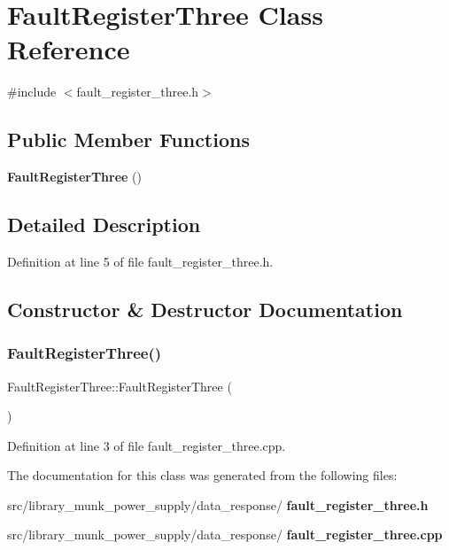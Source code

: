 \section{Fault\+Register\+Three Class Reference}
\label{class_fault_register_three}


{\ttfamily \#include $<$fault\+\_\+register\+\_\+three.\+h$>$}

\subsection*{Public Member Functions}
\begin{DoxyCompactItemize}
\item 
\textbf{ Fault\+Register\+Three} ()
\end{DoxyCompactItemize}


\subsection{Detailed Description}


Definition at line 5 of file fault\+\_\+register\+\_\+three.\+h.



\subsection{Constructor \& Destructor Documentation}
\mbox{\label{class_fault_register_three_a145488e5c4106e3d4a7ad997948d642d}} 
\subsubsection{Fault\+Register\+Three()}
{\footnotesize\ttfamily Fault\+Register\+Three\+::\+Fault\+Register\+Three (\begin{DoxyParamCaption}{ }\end{DoxyParamCaption})}



Definition at line 3 of file fault\+\_\+register\+\_\+three.\+cpp.



The documentation for this class was generated from the following files\+:\begin{DoxyCompactItemize}
\item 
src/library\+\_\+munk\+\_\+power\+\_\+supply/data\+\_\+response/\textbf{ fault\+\_\+register\+\_\+three.\+h}\item 
src/library\+\_\+munk\+\_\+power\+\_\+supply/data\+\_\+response/\textbf{ fault\+\_\+register\+\_\+three.\+cpp}\end{DoxyCompactItemize}
